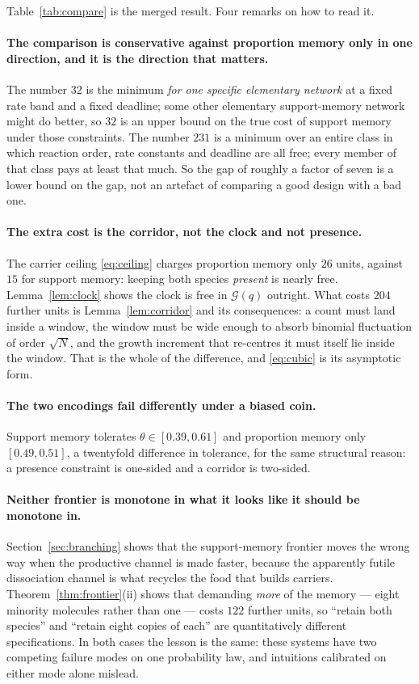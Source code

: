 \documentclass[11pt]{article}
\theoremstyle{plain}
\theoremstyle{definition}
\theoremstyle{remark}
\begin{document}
Table~\ref{tab:compare} is the merged result. Four remarks on how to read it.

\paragraph{The comparison is conservative against proportion memory only in
one direction, and it is the direction that matters.} The number $32$ is the
minimum \emph{for one specific elementary network} at a fixed rate band and a
fixed deadline; some other elementary support-memory network might do better,
so $32$ is an upper bound on the true cost of support memory under those
constraints. The number $231$ is a minimum over an entire class in which
reaction order, rate constants and deadline are all free; every member of that
class pays at least that much. So the gap of roughly a factor of seven is a
lower bound on the gap, not an artefact of comparing a good design with a bad
one.

\paragraph{The extra cost is the corridor, not the clock and not presence.}
The carrier ceiling \eqref{eq:ceiling} charges proportion memory only $26$
units, against $15$ for support memory: keeping both species \emph{present}
is nearly free. Lemma~\ref{lem:clock} shows the clock is free in
$\mathcal{G}(q)$ outright. What costs $204$ further units is
Lemma~\ref{lem:corridor} and its consequences: a count must land inside a
window, the window must be wide enough to absorb binomial fluctuation of order
$\sqrt{N}$, and the growth increment that re-centres it must itself lie inside
the window. That is the whole of the difference, and \eqref{eq:cubic} is its
asymptotic form.

\paragraph{The two encodings fail differently under a biased coin.} Support
memory tolerates $\theta\in[0.39,0.61]$ and proportion memory only
$[0.49,0.51]$, a twentyfold difference in tolerance, for the same structural
reason: a presence constraint is one-sided and a corridor is two-sided.

\paragraph{Neither frontier is monotone in what it looks like it should be
monotone in.} Section~\ref{sec:branching} shows that the support-memory
frontier moves the wrong way when the productive channel is made faster,
because the apparently futile dissociation channel is what recycles the food
that builds carriers. Theorem~\ref{thm:frontier}(ii) shows that demanding
\emph{more} of the memory --- eight minority molecules rather than one ---
costs $122$ further units, so ``retain both species'' and ``retain eight
copies of each'' are quantitatively different specifications. In both cases
the lesson is the same: these systems have two competing failure modes on one
probability law, and intuitions calibrated on either mode alone mislead.
\end{document}

